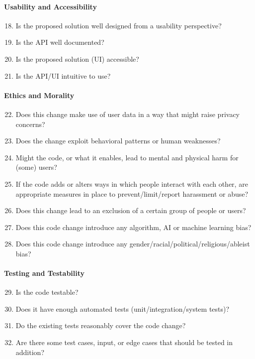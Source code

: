\paragraph{Usability and Accessibility}
\begin{enumerate}
 \setcounter{enumi}{17}
  \item Is the proposed solution well designed from a usability perspective?
  \item Is the API well documented?
  \item Is the proposed solution (UI) accessible?
  \item Is the API/UI intuitive to use?
\end{enumerate}
 
\paragraph{Ethics and Morality}
\begin{enumerate}
 \setcounter{enumi}{21}
 \item Does this change make use of user data in a way that might raise privacy concerns?
 \item Does the change exploit behavioral patterns or human weaknesses?
 \item Might the code, or what it enables, lead to mental and physical harm for (some) users?
 \item If the code adds or alters ways in which people interact with each other, are appropriate measures in place to prevent/limit/report harassment or abuse?
 \item Does this change lead to an exclusion of a certain group of people or users?
 \item Does this code change introduce any algorithm, AI or machine learning bias?
 \item Does this code change introduce any gender/racial/political/religious/ableist bias?
\end{enumerate}
 
\paragraph{Testing and Testability}
\begin{enumerate}
 \setcounter{enumi}{28}
 \item Is the code testable?
 \item Does it have enough automated tests (unit/integration/system tests)?
 \item Do the existing tests reasonably cover the code change?
 \item Are there some test cases, input, or edge cases that should be tested in addition?
\end{enumerate}
 
